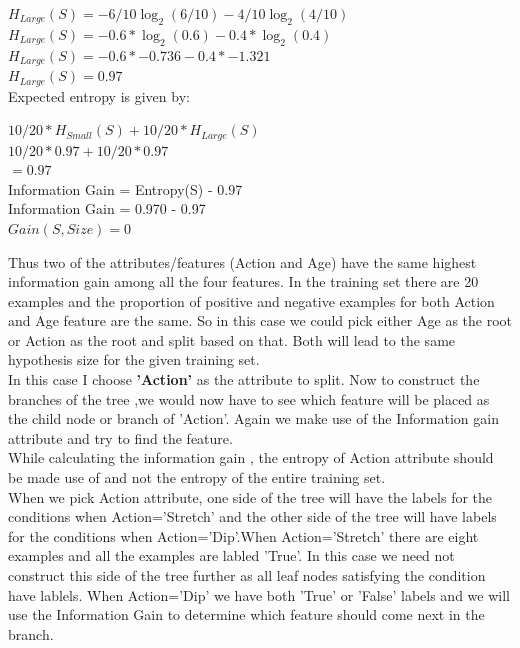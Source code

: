 \documentclass[11pt]{article}
\begin{document}
\begin{enumerate}
\begin{enumerate}
			$H_{Large}(S)=-6/10 \log_2{(6/10)} -4/10\log_2{(4/10)}$\\
			$H_{Large}(S)=-0.6 * \log_2{(0.6)}  -0.4 *\log_2{(0.4)}$\\
			$H_{Large}(S)=-0.6 * -0.736  -0.4* -1.321$\\
			$H_{Large}(S)=0.97$\\
			
			Expected entropy is given by:
			
			$10/20 * H_{Small}(S) + 10/20 * H_{Large}(S)$ \\
			$10/20 * 0.97+ 10/20 * 0.97$ \\
			$=0.97$\\
			
			Information Gain = Entropy(S) - 0.97\\
			Information Gain = 0.970 - 0.97\\
			$\boxed{Gain(S,Size)=0}$
			
			
			Thus two of the attributes/features (Action and Age) have the same highest information gain among all the four features. In the training set there are 20 examples and the proportion of positive and negative examples for both Action and Age feature are the same. So in this case we could pick either Age as the root or Action as the root and split based on that. Both will lead to the same hypothesis size for the given training set.\\
			
			In this case I choose \textbf{'Action'} as the attribute to split. Now to construct the branches of the tree ,we would now have to see which feature will be placed as the child node or branch of 'Action'. Again we make use of the Information gain attribute and try to find the feature.\\
			
			While calculating the information gain , the entropy of Action attribute should be made use of and not the entropy of the entire training set.\\
			
			When we pick Action attribute, one side of the tree will have the labels for the conditions when Action='Stretch' and the other side of the tree will have labels for the conditions when Action='Dip'.When Action='Stretch' there are eight examples and all the examples are labled 'True'. In this case we need not construct this side of the tree further as all leaf nodes satisfying the condition have lablels. When Action='Dip' we have both 'True' or 'False' labels and we will use the Information Gain to determine which feature should come next in the branch.\\
			

\end{enumerate}
\end{enumerate}
\end{document}
